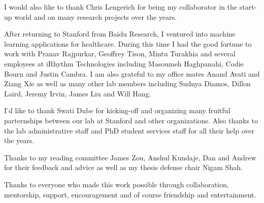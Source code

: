 I would also like to thank Chris Lengerich for being my collaborator in the
start-up world and on many research projects over the years.

After returning to Stanford from Baidu Research, I ventured into machine
learning applications for healthcare. During this time I had the good fortune
to work with Pranav Rajpurkar, Geoffrey Tison, Mintu Turakhia and several
employees at iRhythm Technologies including Masoumeh Haghpanahi, Codie Bourn
and Justin Cambra. I am also grateful to my office mates Anand Avati and Ziang
Xie as well as many other lab members including Sudnya Diamos, Dillon Laird,
Jeremy Irvin, James Liu and Will Hang.

I'd like to thank Swati Dube for kicking-off and organizing many fruitful
parternships between our lab at Stanford and other organizations. Also thanks
to the lab administrative staff and PhD student services staff for all their
help over the years.

Thanks to my reading committee James Zou, Anshul Kundaje, Dan and Andrew for
their feedback and advice as well as my thesis defense chair Nigam Shah.

Thanks to everyone who made this work possible through collaboration,
mentorship, support, encouragement and of course friendship and entertainment.

\afterpreface

